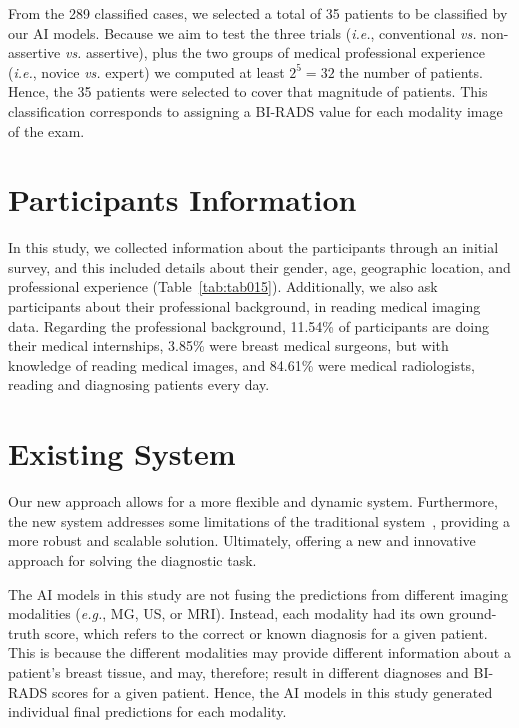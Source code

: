 From the 289 classified cases, we selected a total of 35 patients to be classified by our \ac{AI} models.
Because we aim to test the three trials ({\it i.e.}, conventional {\it vs.} non-assertive {\it vs.} assertive), plus the two groups of medical professional experience ({\it i.e.}, novice {\it vs.} expert) we computed at least $2^5=32$ the number of patients.
Hence, the 35 patients were selected to cover that magnitude of patients.
This classification corresponds to assigning a \ac{BI-RADS} value for each modality image of the exam.

\section{Participants Information}
\label{sec:app001003}

In this study, we collected information about the participants through an initial survey, and this included details about their gender, age, geographic location, and professional experience (Table~\ref{tab:tab015}).
Additionally, we also ask participants about their professional background, in reading medical imaging data.
Regarding the professional background, 11.54\% of participants are doing their medical internships, 3.85\% were breast medical surgeons, but with knowledge of reading medical images, and 84.61\% were medical radiologists, reading and diagnosing patients every day.



\section{Existing System}
\label{sec:app001004}

Our new approach allows for a more flexible and dynamic system.
Furthermore, the new system addresses some limitations of the traditional system~\cite{CALISTO2022102285}, providing a more robust and scalable solution.
Ultimately, offering a new and innovative approach for solving the diagnostic task.

The \ac{AI} models in this study are not fusing the predictions from different imaging modalities ({\it e.g.}, \ac{MG}, \ac{US}, or \ac{MRI}).
Instead, each modality had its own ground-truth score, which refers to the correct or known diagnosis for a given patient.
This is because the different modalities may provide different information about a patient's breast tissue, and may, therefore; result in different diagnoses and \ac{BI-RADS} scores for a given patient.
Hence, the \ac{AI} models in this study generated individual final predictions for each modality.

